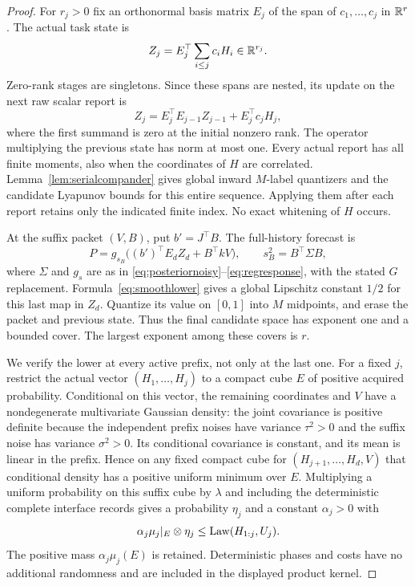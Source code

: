 \begin{proof}
For $r_j>0$ fix an orthonormal basis matrix $E_j$ of the span of $c_1,\ldots,c_j$ in $\mathbb R^r$. The actual task state is
\[
 Z_j=E_j^\top\sum_{i\le j}c_iH_i\in\mathbb R^{r_j}.
\]
Zero-rank stages are singletons. Since these spans are nested, its update on the next raw scalar report is
\begin{equation}\label{eq:rankrecursion}
 Z_j=E_j^\top E_{j-1} Z_{j-1}+E_j^\top c_j H_j,
\end{equation}
where the first summand is zero at the initial nonzero rank. The operator multiplying the previous state has norm at most one. Every actual report has all finite moments, also when the coordinates of $H$ are correlated. Lemma~\ref{lem:serialcompander} gives global inward $M$-label quantizers and the candidate Lyapunov bounds for this entire sequence. Applying them after each report retains only the indicated finite index. No exact whitening of $H$ occurs.

At the suffix packet $(V,B)$, put $b'=J^\top B$. The full-history forecast is
\begin{equation}\label{eq:rankresponse}
 P=g_{s_B}\bigl((b')^\top E_dZ_d+B^\top kV\bigr),\qquad
 s_B^2=B^\top\Sigma B,
\end{equation}
where $\Sigma$ and $g_s$ are as in \eqref{eq:posteriornoisy}--\eqref{eq:regresponse}, with the stated $G$ replacement. Formula~\eqref{eq:smoothlower} gives a global Lipschitz constant $1/2$ for this last map in $Z_d$. Quantize its value on $[0,1]$ into $M$ midpoints, and erase the packet and previous state. Thus the final candidate space has exponent one and a bounded cover. The largest exponent among these covers is $r$.

We verify the lower at every active prefix, not only at the last one. For a fixed $j$, restrict the actual vector $(H_1,\ldots,H_j)$ to a compact cube $E$ of positive acquired probability. Conditional on this vector, the remaining coordinates and $V$ have a nondegenerate multivariate Gaussian density: the joint covariance is positive definite because the independent prefix noises have variance $\tau^2>0$ and the suffix noise has variance $\sigma^2>0$. Its conditional covariance is constant, and its mean is linear in the prefix. Hence on any fixed compact cube for $(H_{j+1},\ldots,H_d,V)$ that conditional density has a positive uniform minimum over $E$. Multiplying a uniform probability on this suffix cube by $\lambda$ and including the deterministic complete interface records gives a probability $\eta_j$ and a constant $\alpha_j>0$ with
\[
 \alpha_j\mu_j|_E\otimes\eta_j\le\operatorname{Law}(H_{1:j},U_j).
\]
The positive mass $\alpha_j\mu_j(E)$ is retained. Deterministic phases and costs have no additional randomness and are included in the displayed product kernel.


\end{proof}
